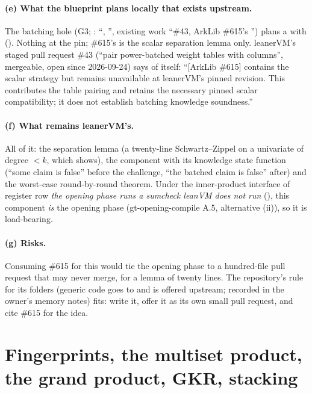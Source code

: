 \paragraph{(e) What the blueprint plans locally that exists upstream.}
The batching hole (G3; : ``, '', existing work
``\#43, ArkLib \#615's '') plans a  with
 (). Nothing at the pin; \#615's
 is the scalar separation lemma only. leanerVM's staged pull request \#43
(``pair power-batched weight tables with columns'', mergeable, open since 2026-09-24) says of
itself: ``[ArkLib \#615] contains the scalar strategy but remains unavailable at leanerVM's
pinned revision. This contributes the table pairing and retains the necessary pinned scalar
compatibility; it does not establish batching knowledge soundness.''

\paragraph{(f) What remains leanerVM's.}
All of it: the separation lemma (a twenty-line Schwartz--Zippel on a univariate of degree
$< k$, which  shows), the  component with its
knowledge state function (``some claim is false'' before the challenge, ``the batched claim is
false'' after) and the worst-case round-by-round theorem. Under the inner-product interface of
register row \emph{the opening phase runs a sumcheck leanVM does not run} (), this
component \emph{is} the opening phase (gt-opening-compile A.5, alternative (ii)), so it is
load-bearing.

\paragraph{(g) Risks.}
Consuming \#615 for this would tie the opening phase to a hundred-file pull request that may
never merge, for a lemma of twenty lines. The repository's rule for its  folders
(generic code goes to  and is offered upstream; recorded in the owner's memory
notes) fits: write it, offer it as its own small pull request, and cite \#615 for the idea.

\section{Fingerprints, the multiset product, the grand product, GKR, stacking}\label{sec:ark-gkr}

